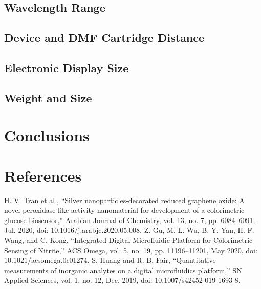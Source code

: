 \documentclass[conference]{IEEEtran}
\begin{document}
\subsection{Wavelength Range}
\subsection{Device and DMF Cartridge Distance}
\subsection{Electronic Display Size}
\subsection{Weight and Size}

\section{Conclusions}

\section*{References}


\begin{thebibliography}{00}
 H. V. Tran et al., “Silver nanoparticles-decorated reduced graphene oxide: A novel peroxidase-like activity nanomaterial for development of a colorimetric glucose biosensor,” Arabian Journal of Chemistry, vol. 13, no. 7, pp. 6084–6091, Jul. 2020, doi: 10.1016/j.arabjc.2020.05.008.
 Z. Gu, M. L. Wu, B. Y. Yan, H. F. Wang, and C. Kong, “Integrated Digital Microfluidic Platform for Colorimetric Sensing of Nitrite,” ACS Omega, vol. 5, no. 19, pp. 11196–11201, May 2020, doi: 10.1021/acsomega.0c01274.
 S. Huang and R. B. Fair, “Quantitative measurements of inorganic analytes on a digital microfluidics platform,” SN Applied Sciences, vol. 1, no. 12, Dec. 2019, doi: 10.1007/s42452-019-1693-8.
\end{thebibliography}
\end{document}
